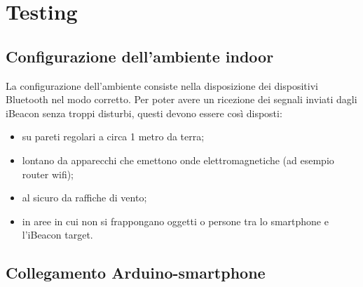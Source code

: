 \chapter{Testing}

\section{Configurazione dell'ambiente indoor}
La configurazione dell'ambiente consiste nella disposizione dei dispositivi Bluetooth nel modo corretto.
Per poter avere un ricezione dei segnali inviati dagli iBeacon senza troppi disturbi, questi devono essere così disposti:
\begin{itemize}
	\item su pareti regolari a circa 1 metro da terra;
	
	\item lontano da apparecchi che emettono onde elettromagnetiche (ad esempio router wifi);
	
	\item al sicuro da raffiche di vento;
	
	\item in aree in cui non si frappongano oggetti o persone tra lo smartphone e l'iBeacon target.
\end{itemize}

\newpage
\section{Collegamento Arduino-smartphone}

